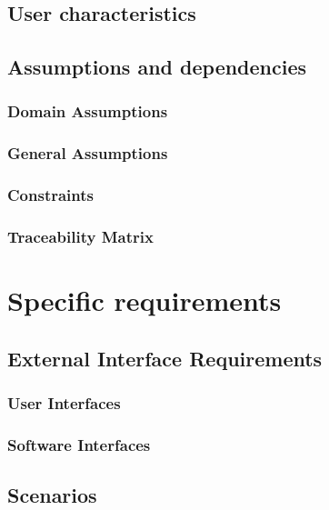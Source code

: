 \documentclass[12pt]{article}
\begin{document}
	\subsection{User characteristics}
	
	
	\subsection{Assumptions and dependencies}
	\subsubsection{Domain Assumptions}
	
	
	\subsubsection{General Assumptions}
	
	\clearpage
	\subsubsection{Constraints}
	
	\subsubsection{Traceability Matrix}
	
	
	\clearpage
	\section{Specific requirements}
	\subsection{External Interface Requirements}
	\subsubsection{User Interfaces}
	
	\subsubsection{Software Interfaces}
	
	
	\clearpage
	\subsection{Scenarios}
\end{document}
